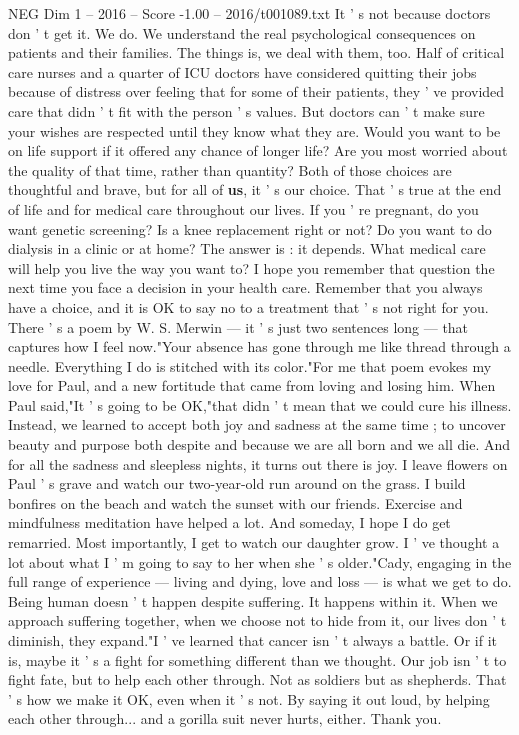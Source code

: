 \begin{textsample}{NEG Dim 1 – 2016 – Score -1.00 – 2016/t001089.txt}
It ' s not because doctors don ' t get it.
We do.
We understand the real psychological consequences on patients and their families.
The things is, we deal with them, too.
Half of critical care nurses and a quarter of ICU doctors have considered quitting their jobs because of distress over feeling that for some of their patients, they ' ve provided care that didn ' t fit with the person ' s values.
But doctors can ' t make sure your wishes are respected until they know what they are.
Would you want to be on life support if it offered any chance of longer life?
Are you most worried about the quality of that time, rather than quantity?
Both of those choices are thoughtful and brave, but for all of \textbf{us}, it ' s our choice.
That ' s true at the end of life and for medical care throughout our lives.
If you ' re pregnant, do you want genetic screening?
Is a knee replacement right or not?
Do you want to do dialysis in a clinic or at home?
The answer is : it depends.
What medical care will help you live the way you want to?
I hope you remember that question the next time you face a decision in your health care.
Remember that you always have a choice, and it is OK to say no to a treatment that ' s not right for you.
There ' s a poem by W.
S.
Merwin — it ' s just two sentences long — that captures how I feel now."Your absence has gone through me like thread through a needle.
Everything I do is stitched with its color."For me that poem evokes my love for Paul, and a new fortitude that came from loving and losing him.
When Paul said,"It ' s going to be OK,"that didn ' t mean that we could cure his illness.
Instead, we learned to accept both joy and sadness at the same time ; to uncover beauty and purpose both despite and because we are all born and we all die.
And for all the sadness and sleepless nights, it turns out there is joy.
I leave flowers on Paul ' s grave and watch our two-year-old run around on the grass.
I build bonfires on the beach and watch the sunset with our friends.
Exercise and mindfulness meditation have helped a lot.
And someday, I hope I do get remarried.
Most importantly, I get to watch our daughter grow.
I ' ve thought a lot about what I ' m going to say to her when she ' s older."Cady, engaging in the full range of experience — living and dying, love and loss — is what we get to do.
Being human doesn ' t happen despite suffering.
It happens within it.
When we approach suffering together, when we choose not to hide from it, our lives don ' t diminish, they expand."I ' ve learned that cancer isn ' t always a battle.
Or if it is, maybe it ' s a fight for something different than we thought.
Our job isn ' t to fight fate, but to help each other through.
Not as soldiers but as shepherds.
That ' s how we make it OK, even when it ' s not.
By saying it out loud, by helping each other through... and a gorilla suit never hurts, either.
Thank you.

\end{textsample}
